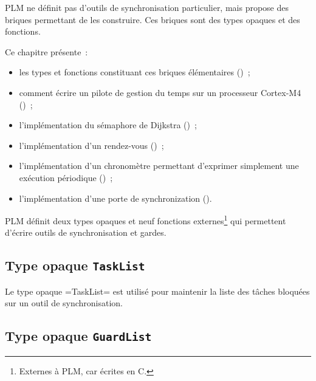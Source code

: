 





PLM ne définit pas d'outils de synchronisation particulier, mais propose des briques permettant de les construire. Ces briques sont des types opaques et des fonctions.

Ce chapitre présente~:
\begin{itemize}
  \item les types et fonctions constituant ces briques élémentaires ()~;
  \item comment écrire un pilote de gestion du temps sur un processeur Cortex-M4 ()~;
  \item l'implémentation du sémaphore de Dijkstra ()~;
  \item l'implémentation d'un rendez-vous ()~;
  \item l'implémentation d'un chronomètre permettant d'exprimer simplement une exécution périodique ()~;
  \item l'implémentation d'une porte de synchronization ().
\end{itemize}











PLM définit deux types opaques et neuf fonctions externes\footnote{Externes à PLM, car écrites en C.} qui permettent d'écrire outils de synchronisation et gardes.

\subsection{Type opaque \texttt{TaskList}}

Le type opaque \plm=TaskList= est utilisé pour maintenir la liste des tâches bloquées sur un outil de synchronisation.


\subsection{Type opaque \texttt{GuardList}}

